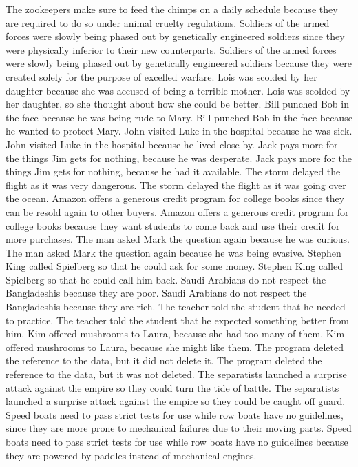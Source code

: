\documentclass{article}
\begin{document}
\begin{enumerate}
	The zookeepers make sure to feed the chimps on a daily schedule because they are required to do so under animal cruelty regulations.
	Soldiers of the armed forces were slowly being phased out by genetically engineered soldiers since they were physically inferior to their new counterparts.
	Soldiers of the armed forces were slowly being phased out by genetically engineered soldiers because they were created solely for the purpose of excelled warfare.
	Lois was scolded by her daughter because she was accused of being a terrible mother.
	Lois was scolded by her daughter, so she thought about how she could be better.
	Bill punched Bob in the face because he was being rude to Mary.
	Bill punched Bob in the face because he wanted to protect Mary.
	John visited Luke in the hospital because he was sick.
	John visited Luke in the hospital because he lived close by.
	Jack pays more for the things Jim gets for nothing, because he was desperate.
	Jack pays more for the things Jim gets for nothing, because he had it available.
	The storm delayed the flight as it was very dangerous.
	The storm delayed the flight as it was going over the ocean.
	Amazon offers a generous credit program for college books since they can be resold again to other buyers.
	Amazon offers a generous credit program for college books because they want students to come back and use their credit for more purchases.
	The man asked Mark the question again because he was curious.
	The man asked Mark the question again because he was being evasive.
	Stephen King called Spielberg so that he could ask for some money.
	Stephen King called Spielberg so that he could call him back.
	Saudi Arabians do not respect the Bangladeshis because they are poor.
	Saudi Arabians do not respect the Bangladeshis because they are rich.
	The teacher told the student that he needed to practice.
	The teacher told the student that he expected something better from him.
	Kim offered mushrooms to Laura, because she had too many of them.
	Kim offered mushrooms to Laura, because she might like them.
	The program deleted the reference to the data, but it did not delete it.
	The program deleted the reference to the data, but it was not deleted.
	The separatists launched a surprise attack against the empire so they could turn the tide of battle.
	The separatists launched a surprise attack against the empire so they could be caught off guard.
	Speed boats need to pass strict tests for use while row boats have no guidelines, since they are more prone to mechanical failures due to their moving parts.
	Speed boats need to pass strict tests for use while row boats have no guidelines because they are powered by paddles instead of mechanical engines.

\end{enumerate}
\end{document}
